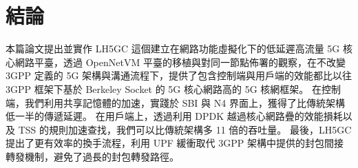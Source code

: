 \chapter{結論}
\label{chapter:conclusion}

本篇論文提出並實作 LH5GC 這個建立在網路功能虛擬化下的低延遲高流量 5G 核心網路平臺，透過 OpenNetVM 平臺的移植與對同一節點佈署的觀察，在不改變 3GPP 定義的 5G 架構與溝通流程下，提供了包含控制端與用戶端的效能都比以往 3GPP 框架下基於 Berkeley Socket 的 5G 核心網路高的 5G 核網框架。
在控制端，我們利用共享記憶體的加速，實踐於 SBI 與 N4 界面上，獲得了比傳統架構低一半的傳遞延遲。
在用戶端上，透過利用 DPDK 越過核心網路疊的效能損耗以及 TSS 的規則加速查找，我們可以比傳統架構多 11 倍的吞吐量。
最後，LH5GC 提出了更有效率的換手流程，利用 UPF 緩衝取代 3GPP 架構中提供的封包間接轉發機制，避免了過長的封包轉發路徑。
